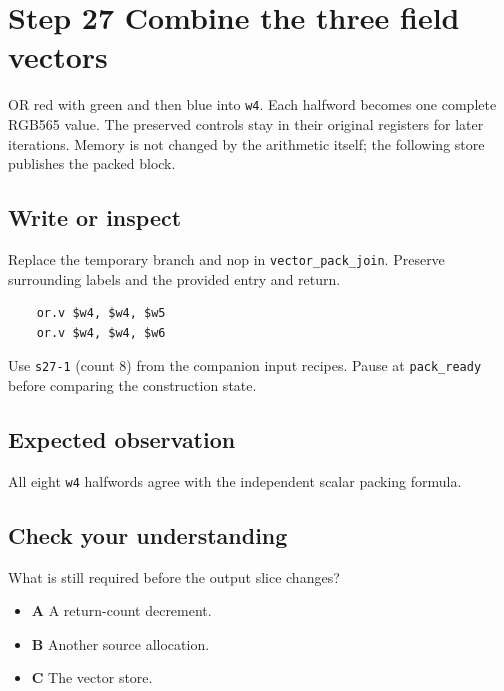 \section{Step 27 Combine the three field vectors}\label{rgb-s27}

OR red with green and then blue into \texttt{w4}. Each halfword becomes one complete RGB565 value. The preserved controls stay in their original registers for later iterations. Memory is not changed by the arithmetic itself; the following store publishes the packed block.

\subsection{Write or inspect}
Replace the temporary branch and nop in \texttt{vector\_pack\_join}. Preserve surrounding labels and the provided entry and return.

\begin{verbatim}
    or.v $w4, $w4, $w5
    or.v $w4, $w4, $w6
\end{verbatim}
Use \texttt{s27-1} (count 8) from the companion input recipes. Pause at \texttt{pack\_ready} before comparing the construction state.

\subsection{Expected observation}
All eight \texttt{w4} halfwords agree with the independent scalar packing formula.

\subsection{Check your understanding}
What is still required before the output slice changes?

\begin{itemize}
  \item \textbf{A} A return-count decrement.
  \item \textbf{B} Another source allocation.
  \item \textbf{C} The vector store.
\end{itemize}
